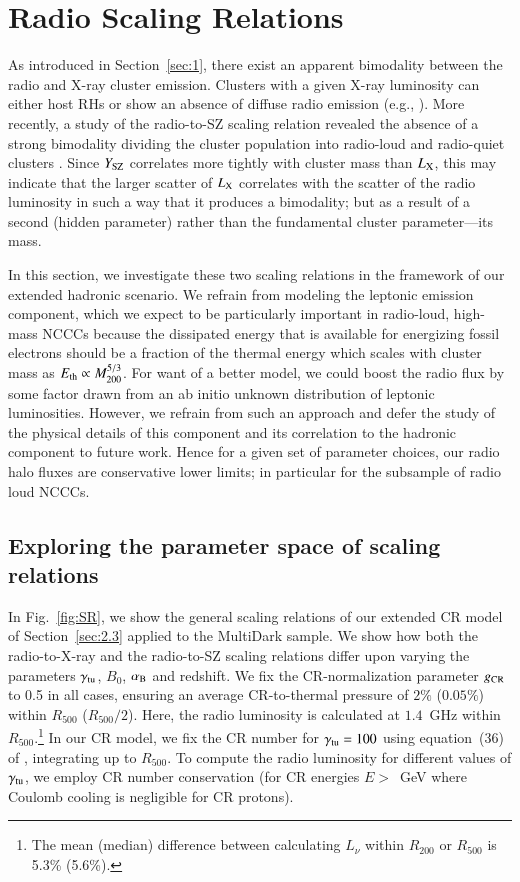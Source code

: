 \documentclass[useAMS,usenatbib]{mn2e}
\begin{document}
\section{Radio Scaling Relations}
\label{sec:4}
As introduced in Section~\ref{sec:1}, there exist an apparent bimodality between
the radio and X-ray cluster emission. Clusters with a given X-ray luminosity can
either host RHs or show an absence of diffuse radio emission (e.g.,
\citealp{2009A&A...507..661B,2011A&A...527A..99E}). More recently, a study of
the radio-to-SZ scaling relation revealed the absence of a strong bimodality
dividing the cluster population into radio-loud and radio-quiet clusters
\citep{2012MNRAS.421L.112B}. Since $Y_{{\mathrm{SZ}}}$ correlates more tightly with
cluster mass than $L_{{\mathrm{X}}}$, this may indicate that the larger scatter of
$L_{{\mathrm{X}}}$ correlates with the scatter of the radio luminosity in such a way
that it produces a bimodality; but as a result of a second (hidden parameter)
rather than the fundamental cluster parameter---its mass. 

In this section, we investigate these two scaling relations in the framework of
our extended hadronic scenario. We refrain from modeling the leptonic emission
component, which we expect to be particularly important in radio-loud, high-mass
NCCCs because the dissipated energy that is available for energizing fossil
electrons should be a fraction of the thermal energy which scales with cluster
mass as $E_{\mathrm{th}}\propto M_{200}^{5/3}$. For want of a better model, we could
boost the radio flux by some factor drawn from an ab initio unknown distribution
of leptonic luminosities. However, we refrain from such an approach and defer
the study of the physical details of this component and its correlation to the
hadronic component to future work. Hence for a given set of parameter choices,
our radio halo fluxes are conservative lower limits; in particular for the
subsample of radio loud NCCCs.


\subsection{Exploring the parameter space of scaling relations}

In Fig.~\ref{fig:SR}, we show the general scaling relations of our extended CR
model of Section~\ref{sec:2.3} applied to the MultiDark sample. We show how both
the radio-to-X-ray and the radio-to-SZ scaling relations differ upon varying the
parameters $\gamma_{{\mathrm{tu}}}$, $B_{0}$, $\alpha_{{\mathrm{B}}}$ and redshift. We fix
the CR-normalization parameter $g_{{\mathrm{CR}}}$ to 0.5 in all cases, ensuring an
average CR-to-thermal pressure of $2\%$ ($0.05\%$) within $R_{500}$
($R_{500}/2$). Here, the radio luminosity is calculated at $1.4$~GHz within
$R_{500}.$\footnote{The mean (median) difference between calculating $L_{\nu}$
  within $R_{200}$ or $R_{500}$ is 5.3\% (5.6\%).}  In our CR model, we fix the
CR number for $\gamma_{{\mathrm{tu}}}=100$ using equation~(36) of
\cite{2011A&A...527A..99E}, integrating up to $R_{500}$. To compute the radio
luminosity for different values of $\gamma_{{\mathrm{tu}}}$, we employ CR number
conservation (for CR energies $E>$~GeV where Coulomb cooling is negligible for CR
protons).
\end{document}
